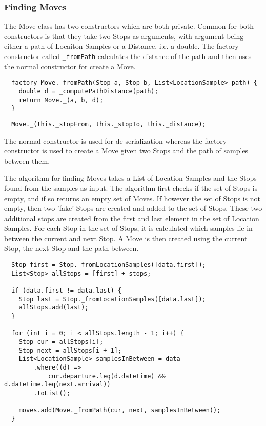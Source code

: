 \subsubsection{Finding Moves}
The Move class has two constructors which are both private. Common for both constructors is that they take two Stops as arguments, with argument being either a path of Locaiton Samples or a Distance, i.e. a double. The factory constructor called \verb|_fromPath| calculates the distance of the path and then uses the normal constructor for create a Move. 
\begin{verbatim}
  factory Move._fromPath(Stop a, Stop b, List<LocationSample> path) {
    double d = _computePathDistance(path);
    return Move._(a, b, d);
  }
\end{verbatim}

\begin{verbatim}
  Move._(this._stopFrom, this._stopTo, this._distance);
\end{verbatim}
The normal constructor is used for de-serialization whereas the factory constructor is used to create a Move given two Stops and the path of samples between them.

The algorithm for finding Moves takes a List of Location Samples and the Stops found from the samples as input. The algorithm first checks if the set of Stops is empty, and if so returns an empty set of Moves. If however the set of Stops is not empty, then two 'fake' Stops are created and added to the set of Stops. These two additional stops are created from the first and last element in the set of Location Samples. For each Stop in the set of Stops, it is calculated which samples lie in between the current and next Stop. A Move is then created using the current Stop, the next Stop and the path between. 

\begin{verbatim}
  Stop first = Stop._fromLocationSamples([data.first]);
  List<Stop> allStops = [first] + stops;

  if (data.first != data.last) {
    Stop last = Stop._fromLocationSamples([data.last]);
    allStops.add(last);
  }

  for (int i = 0; i < allStops.length - 1; i++) {
    Stop cur = allStops[i];
    Stop next = allStops[i + 1];
    List<LocationSample> samplesInBetween = data
        .where((d) =>
            cur.departure.leq(d.datetime) && d.datetime.leq(next.arrival))
        .toList();

    moves.add(Move._fromPath(cur, next, samplesInBetween));
  }
\end{verbatim}

